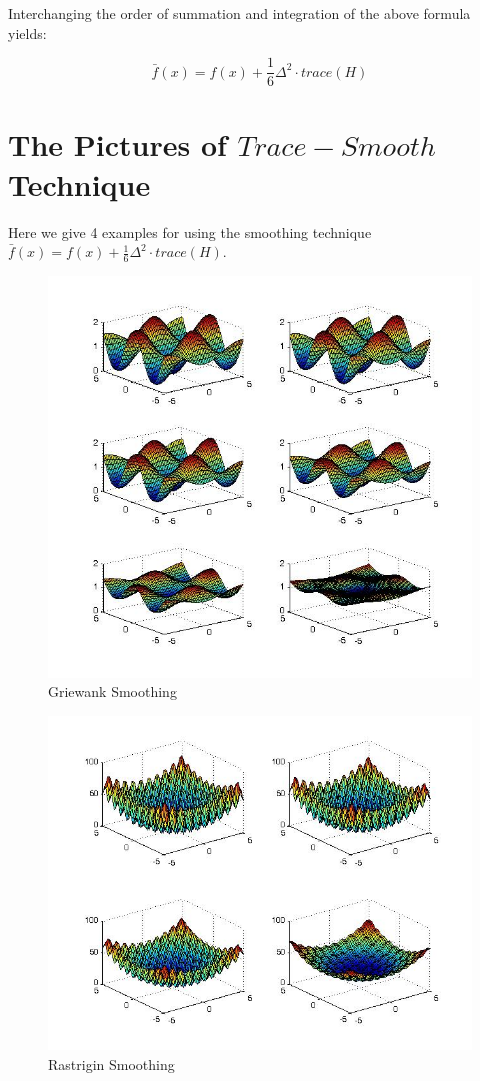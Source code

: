\documentclass[letterpaper,12pt,titlepage,oneside,final]{book}
\begin{document}
Interchanging the order of summation and integration of the above formula yields:

\begin{equation}
\bar{f}(x)=f(x)+\frac{1}{6}\Delta^2\cdot trace(H)
\end{equation}

\section{The Pictures of $Trace-Smooth$ Technique}

Here we give 4 examples for using the smoothing technique $\bar{f}(x)=f(x)+\frac{1}{6}\Delta^2\cdot trace(H)$.

\begin{figure}[H]
\includegraphics[scale=0.75]{smoothgriewank.jpg}
\caption{Griewank Smoothing}
\end{figure}

\begin{figure}[H]
\includegraphics[scale=0.75]{smoothrast.jpg}
\caption{Rastrigin Smoothing}
\end{figure}
\end{document}

